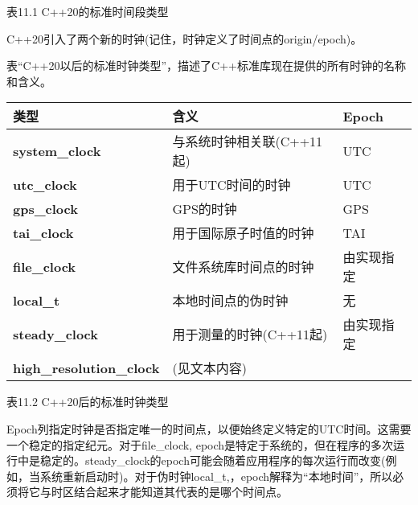 \begin{center}
表11.1 C++20的标准时间段类型
\end{center}


C++20引入了两个新的时钟(记住，时钟定义了时间点的origin/epoch)。

表“C++20以后的标准时钟类型”，描述了C++标准库现在提供的所有时钟的名称和含义。

\begin{longtable}[c]{|l|l|l|}
\hline
\textbf{类型}                    & \textbf{含义}                           & \textbf{Epoch} \\ \hline
\endfirsthead
%
\endhead
%
\textbf{system\_clock} & 与系统时钟相关联(C++11起) & UTC    \\ \hline
\textbf{utc\_clock}              & 用于UTC时间的时钟                  & UTC        \\ \hline
\textbf{gps\_clock}              & GPS的时钟                       & GPS        \\ \hline
\textbf{tai\_clock}              & 用于国际原子时值的时钟 & TAI        \\ \hline
\textbf{file\_clock}   & 文件系统库时间点的时钟       & 由实现指定 \\ \hline
\textbf{local\_t}                & 本地时间点的伪时钟          & 无           \\ \hline
\textbf{steady\_clock}           & 用于测量的时钟(C++11起)        & 由实现指定     \\ \hline
\textbf{high\_resolution\_clock} & (见文本内容)                                 &                \\ \hline
\end{longtable}

\begin{center}
表11.2 C++20后的标准时钟类型
\end{center}

Epoch列指定时钟是否指定唯一的时间点，以便始终定义特定的UTC时间。这需要一个稳定的指定纪元。对于file\_clock, epoch是特定于系统的，但在程序的多次运行中是稳定的。steady\_clock的epoch可能会随着应用程序的每次运行而改变(例如，当系统重新启动时)。对于伪时钟local\_t,，epoch解释为“本地时间”，所以必须将它与时区结合起来才能知道其代表的是哪个时间点。

